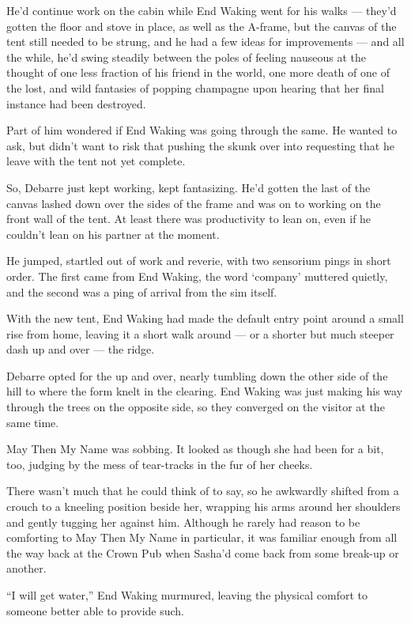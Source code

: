 He'd continue work on the cabin while End Waking went for his walks — they'd gotten the floor and stove in place, as well as the A-frame, but the canvas of the tent still needed to be strung, and he had a few ideas for improvements — and all the while, he'd swing steadily between the poles of feeling nauseous at the thought of one less fraction of his friend in the world, one more death of one of the lost, and wild fantasies of popping champagne upon hearing that her final instance had been destroyed.

Part of him wondered if End Waking was going through the same. He wanted to ask, but didn't want to risk that pushing the skunk over into requesting that he leave with the tent not yet complete.

So, Debarre just kept working, kept fantasizing. He'd gotten the last of the canvas lashed down over the sides of the frame and was on to working on the front wall of the tent. At least there was productivity to lean on, even if he couldn't lean on his partner at the moment.

He jumped, startled out of work and reverie, with two sensorium pings in short order. The first came from End Waking, the word `company' muttered quietly, and the second was a ping of arrival from the sim itself.

With the new tent, End Waking had made the default entry point around a small rise from home, leaving it a short walk around — or a shorter but much steeper dash up and over — the ridge.

Debarre opted for the up and over, nearly tumbling down the other side of the hill to where the form knelt in the clearing. End Waking was just making his way through the trees on the opposite side, so they converged on the visitor at the same time.

May Then My Name was sobbing. It looked as though she had been for a bit, too, judging by the mess of tear-tracks in the fur of her cheeks.

There wasn't much that he could think of to say, so he awkwardly shifted from a crouch to a kneeling position beside her, wrapping his arms around her shoulders and gently tugging her against him. Although he rarely had reason to be comforting to May Then My Name in particular, it was familiar enough from all the way back at the Crown Pub when Sasha'd come back from some break-up or another.

``I will get water,'' End Waking murmured, leaving the physical comfort to someone better able to provide such.

